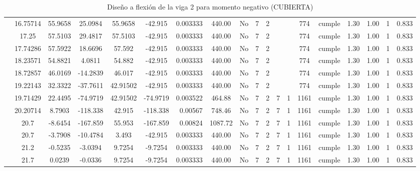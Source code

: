 \begin{table}[H]
{\begin{tabular}{|c|c|c|c|c|c|r|c|c|c|c|c|c|c|c|c|c|c|c|}
\cline{2-19}    & 16.75714 & 55.9658 & 25.0984 & 55.9658 & -42.915 & 0.003333 & 440.00 & No  & 7   & 2   &     &     & 774 & \cellcolor[rgb]{ .776,  .937,  .808}cumple & 1.30 & 1.00 & 1   & 0.833 \bigstrut\\
\cline{2-19}    & 17.25 & 57.5103 & 29.4817 & 57.5103 & -42.915 & 0.003333 & 440.00 & No  & 7   & 2   &     &     & 774 & \cellcolor[rgb]{ .776,  .937,  .808}cumple & 1.30 & 1.00 & 1   & 0.833 \bigstrut\\
\cline{2-19}    & 17.74286 & 57.5922 & 18.6696 & 57.592 & -42.915 & 0.003333 & 440.00 & No  & 7   & 2   &     &     & 774 & \cellcolor[rgb]{ .776,  .937,  .808}cumple & 1.30 & 1.00 & 1   & 0.833 \bigstrut\\
\cline{2-19}    & 18.23571 & 54.8821 & 4.0811 & 54.882 & -42.915 & 0.003333 & 440.00 & No  & 7   & 2   &     &     & 774 & \cellcolor[rgb]{ .776,  .937,  .808}cumple & 1.30 & 1.00 & 1   & 0.833 \bigstrut\\
\cline{2-19}    & 18.72857 & 46.0169 & -14.2839 & 46.017 & -42.915 & 0.003333 & 440.00 & No  & 7   & 2   &     &     & 774 & \cellcolor[rgb]{ .776,  .937,  .808}cumple & 1.30 & 1.00 & 1   & 0.833 \bigstrut\\
\cline{2-19}    & 19.22143 & 32.3322 & -37.7611 & 42.91502 & -42.915 & 0.003333 & 440.00 & No  & 7   & 2   &     &     & 774 & \cellcolor[rgb]{ .776,  .937,  .808}cumple & 1.30 & 1.00 & 1   & 0.833 \bigstrut\\
\cline{2-19}    & 19.71429 & 22.4495 & -74.9719 & 42.91502 & -74.9719 & 0.003522 & 464.88 & No  & 7   & 2   & 7   & 1   & 1161 & \cellcolor[rgb]{ .776,  .937,  .808}cumple & 1.30 & 1.00 & 1   & 0.833 \bigstrut\\
\cline{2-19}    & 20.20714 & 8.7903 & -118.338 & 42.915 & -118.338 & 0.00567 & 748.46 & No  & 7   & 2   & 7   & 1   & 1161 & \cellcolor[rgb]{ .776,  .937,  .808}cumple & 1.30 & 1.00 & 1   & 0.833 \bigstrut\\
\cline{2-19}    & \cellcolor[rgb]{ .851,  .882,  .949}20.7 & -8.6454 & -167.859 & 55.953 & -167.859 & 0.00824 & 1087.72 & No  & 7   & 2   & 7   & 1   & 1161 & \cellcolor[rgb]{ .776,  .937,  .808}cumple & 1.30 & 1.00 & 1   & 0.833 \bigstrut\\
\cline{2-19}    & \cellcolor[rgb]{ .851,  .882,  .949}20.7 & -3.7908 & -10.4784 & 3.493 & -42.915 & 0.003333 & 440.00 & No  & 7   & 2   & 7   & 1   & 1161 & \cellcolor[rgb]{ .776,  .937,  .808}cumple & 1.30 & 1.00 & 1   & 0.833 \bigstrut\\
\cline{2-19}    & 21.2 & -0.5235 & -3.0394 & 9.7254 & -9.7254 & 0.003333 & 440.00 & No  & 7   & 2   & 7   & 1   & 1161 & \cellcolor[rgb]{ .776,  .937,  .808}cumple & 1.30 & 1.00 & 1   & 0.833 \bigstrut\\
\cline{2-19}    & 21.7 & 0.0239 & -0.0336 & 9.7254 & -9.7254 & 0.003333 & 440.00 & No  & 7   & 2   & 7   & 1   & 1161 & \cellcolor[rgb]{ .776,  .937,  .808}cumple & 1.30 & 1.00 & 1   & 0.833 \bigstrut\\
\hline
\end{tabular}%

  
 
  }
      \caption{Diseño a flexión de la viga 2 para momento negativo (CUBIERTA) }
  \label{tab:F VG2 CUB M-}%
\end{table}%
